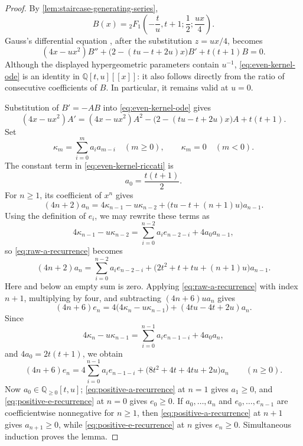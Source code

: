\documentclass{amsart}
\theoremstyle{definition}
\theoremstyle{remark}
\begin{document}
\begin{proof}
By \cref{lem:staircase-generating-series},
\[
 B(x)={}_2F_1\left(-\frac tu,t+1;\frac12;\frac{ux}{4}\right).
\]
Gauss's differential equation
\cite[Eq.~(15.10.1)]{NISTHandbook2010}, after the substitution \(z=ux/4\),
becomes
\begin{equation}
 (4x-ux^2)B''
 +\bigl(2-(tu-t+2u)x\bigr)B'
 +t(t+1)B=0.
 \label{eq:even-kernel-ode}
\end{equation}
Although the displayed hypergeometric parameters contain \(u^{-1}\),
\eqref{eq:even-kernel-ode} is an identity in
\(\mathbb Q[t,u][[x]]\): it also follows directly from the ratio of
consecutive coefficients of \(B\).  In particular, it remains valid at
\(u=0\).

Substitution of \(B'=-AB\) into \eqref{eq:even-kernel-ode} gives
\begin{equation}
 (4x-ux^2)A'
 =(4x-ux^2)A^2
 -\bigl(2-(tu-t+2u)x\bigr)A+t(t+1).
 \label{eq:even-kernel-riccati}
\end{equation}
Set
\[
 \kappa_m=\sum_{i=0}^m a_i a_{m-i}\quad(m\geq0),
 \qquad \kappa_m=0\quad(m<0).
\]
The constant term in \eqref{eq:even-kernel-riccati} is
\[
 a_0=\frac{t(t+1)}2.
\]
For \(n\geq1\), its coefficient of \(x^n\) gives
\begin{equation}
 (4n+2)a_n
 =4\kappa_{n-1}-u\kappa_{n-2}
  +\bigl(tu-t+(n+1)u\bigr)a_{n-1}.
 \label{eq:raw-a-recurrence}
\end{equation}
Using the definition of $e_i$, we may rewrite these terms as
\[
 4\kappa_{n-1}-u\kappa_{n-2}
 =\sum_{i=0}^{n-2}a_i e_{n-2-i}+4a_0a_{n-1},
\]
so \eqref{eq:raw-a-recurrence} becomes
\begin{equation}
 (4n+2)a_n
 =\sum_{i=0}^{n-2}a_i e_{n-2-i}
  +\bigl(2t^2+t+tu+(n+1)u\bigr)a_{n-1}.
 \label{eq:positive-a-recurrence}
\end{equation}
Here and below an empty sum is zero.  Applying
\eqref{eq:raw-a-recurrence} with index \(n+1\), multiplying by four, and
subtracting \((4n+6)ua_n\) gives
\[
 (4n+6)e_n
 =4\bigl(4\kappa_n-u\kappa_{n-1}\bigr)
  +(4tu-4t+2u)a_n.
\]
Since
\[
 4\kappa_n-u\kappa_{n-1}
 =\sum_{i=0}^{n-1}a_i e_{n-1-i}+4a_0a_n,
\]
and \(4a_0=2t(t+1)\), we obtain
\begin{equation}
 (4n+6)e_n
 =4\sum_{i=0}^{n-1}a_i e_{n-1-i}
  +\bigl(8t^2+4t+4tu+2u\bigr)a_n
 \qquad(n\geq0).
 \label{eq:positive-e-recurrence}
\end{equation}
Now \(a_0\in\mathbb Q_{\geq0}[t,u]\);
\eqref{eq:positive-a-recurrence} at \(n=1\) gives \(a_1\geq0\), and
\eqref{eq:positive-e-recurrence} at \(n=0\) gives \(e_0\geq0\).
If \(a_0,\ldots,a_n\) and \(e_0,\ldots,e_{n-1}\) are coefficientwise
nonnegative for \(n\geq1\), then \eqref{eq:positive-a-recurrence} at
\(n+1\) gives \(a_{n+1}\geq0\), while
\eqref{eq:positive-e-recurrence} at \(n\) gives \(e_n\geq0\).
Simultaneous induction proves the lemma.
\end{proof}
\end{document}
